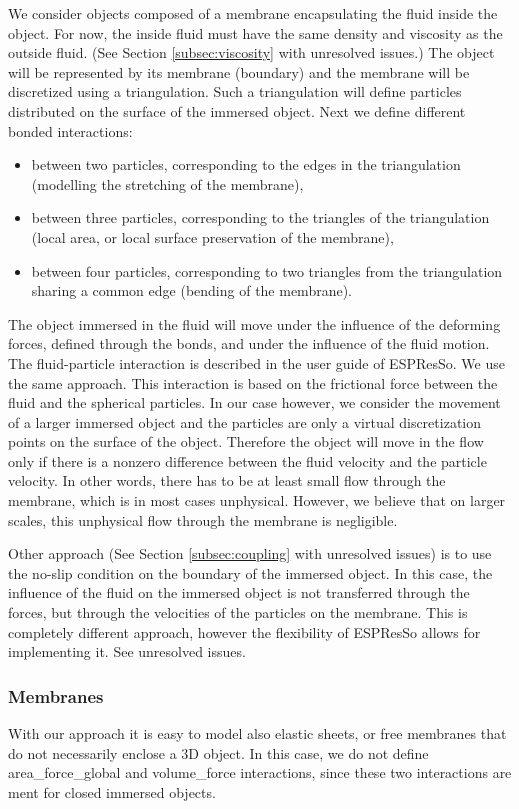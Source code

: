 \documentclass[a4paper]{article}
\begin{document}
We consider objects composed of a membrane encapsulating the fluid inside the object. For now, the inside fluid must have the same density and viscosity as the outside fluid. (See Section \ref{subsec:viscosity} with unresolved issues.) The object will be represented by its membrane (boundary) and the membrane will be discretized using a triangulation. Such a triangulation will define particles distributed on the surface of the immersed object. Next we define different bonded interactions: 
\begin{itemize}
\item between two particles, corresponding to the edges in the triangulation (modelling the stretching of the membrane), 
\item between three particles, corresponding to the triangles of the triangulation (local area, or local surface preservation of the membrane), 
\item between four particles, corresponding to two triangles from the triangulation sharing a common edge (bending of the membrane). 
\end{itemize}

The object immersed  in the fluid will move under the influence of the deforming forces, defined through the bonds, and under the influence of the fluid motion. The fluid-particle interaction is described in the user guide of ESPResSo. We use the same approach. This interaction is based on the frictional force between the fluid and the spherical particles. In our case however, we consider the movement of a larger immersed object and the particles are only a virtual discretization points on the surface of the object. Therefore the object will move in the flow only if there is a nonzero difference between the fluid velocity and the particle velocity. In other words, there has to be at least small flow through the membrane, which is in most cases unphysical. However, we believe that on larger scales, this unphysical flow through the membrane is negligible.

Other approach (See Section \ref{subsec:coupling} with unresolved issues) is to use the no-slip condition on the boundary of the immersed object. In this case, the influence of the fluid on the immersed object is not transferred through the forces, but through the velocities of the particles on the membrane. This is completely different approach, however the flexibility of ESPResSo allows for implementing it. See unresolved issues.

\subsubsection*{Membranes}
With our approach it is easy to model also elastic sheets, or free membranes that do not necessarily enclose a 3D object. In this case, we do not define area\_{}force\_{}global and volume\_{}force interactions, since these two interactions are ment for closed immersed objects.
\end{document}
